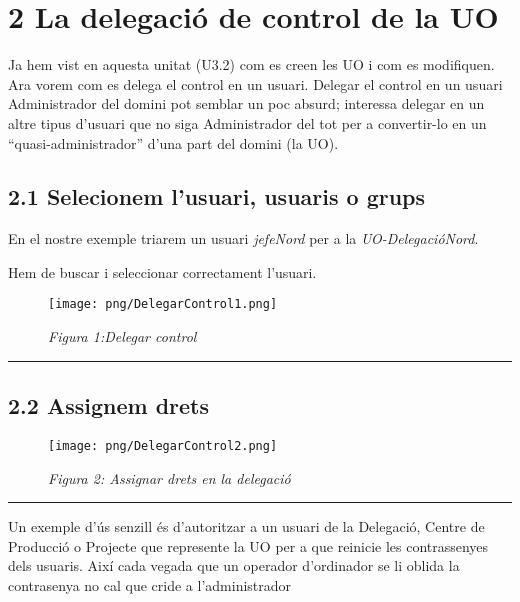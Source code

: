 \documentclass[
  a4paper,
]{article}
\begin{document}
\section{2 La delegació de control de la
UO}\label{la-delegaciuxf3-de-control-de-la-uo}

Ja hem vist en aquesta unitat (U3.2) com es creen les UO i com es
modifiquen. Ara vorem com es delega el control en un usuari. Delegar el
control en un usuari Administrador del domini pot semblar un poc absurd;
interessa delegar en un altre tipus d'usuari que no siga Administrador
del tot per a convertir-lo en un ``quasi-administrador'' d'una part del
domini (la UO).

\subsection{2.1 Selecionem l'usuari, usuaris o
grups}\label{selecionem-lusuari-usuaris-o-grups}

En el nostre exemple triarem un usuari \emph{jefeNord} per a la
\emph{UO-DelegacióNord}.

Hem de buscar i seleccionar correctament l'usuari.

\begin{figure}
\centering
\texttt{[image: png/DelegarControl1.png]}
\caption{\emph{Figura 1:Delegar control}}
\end{figure}

\begin{center}\rule{0.5\linewidth}{0.5pt}\end{center}

\subsection{2.2 Assignem drets}\label{assignem-drets}

\begin{figure}
\centering
\texttt{[image: png/DelegarControl2.png]}
\caption{\emph{Figura 2: Assignar drets en la delegació}}
\end{figure}

\begin{center}\rule{0.5\linewidth}{0.5pt}\end{center}

Un exemple d'ús senzill és d'autoritzar a un usuari de la Delegació,
Centre de Producció o Projecte que represente la UO per a que reinicie
les contrassenyes dels usuaris. Així cada vegada que un operador
d'ordinador se li oblida la contrasenya no cal que cride a
l'administrador
\end{document}
